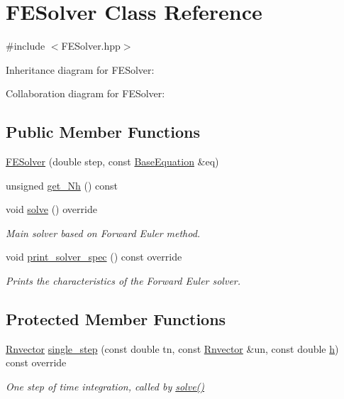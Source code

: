 \hypertarget{classFESolver}{}\section{F\+E\+Solver Class Reference}
\label{classFESolver}


{\ttfamily \#include $<$F\+E\+Solver.\+hpp$>$}



Inheritance diagram for F\+E\+Solver\+:


Collaboration diagram for F\+E\+Solver\+:
\subsection*{Public Member Functions}
\begin{DoxyCompactItemize}
\item 
\hyperlink{classFESolver_adbd4e19eb5c39bdbced70671961bbc4d}{F\+E\+Solver} (double step, const \hyperlink{classBaseEquation}{Base\+Equation} \&eq)
\item 
unsigned \hyperlink{classFESolver_a1b7bde8ef3e3e4650096e1d56ad3add1}{get\+\_\+\+Nh} () const
\item 
void \hyperlink{classFESolver_ac6ac17db7001191c7bb32c3e8ce74d55}{solve} () override
\begin{DoxyCompactList}\small\item\em Main solver based on Forward Euler method. \end{DoxyCompactList}\item 
void \hyperlink{classFESolver_a46f8b70e97141583f68c5dfeb79e80c8}{print\+\_\+solver\+\_\+spec} () const override
\begin{DoxyCompactList}\small\item\em Prints the characteristics of the Forward Euler solver. \end{DoxyCompactList}\end{DoxyCompactItemize}
\subsection*{Protected Member Functions}
\begin{DoxyCompactItemize}
\item 
\hyperlink{utils_8hpp_a8e0cccfe9e5cee5140bfcfbd9a3a6a0e}{Rnvector} \hyperlink{classFESolver_acb3624bbe9132b8ab2989fc97ac33d81}{single\+\_\+step} (const double tn, const \hyperlink{utils_8hpp_a8e0cccfe9e5cee5140bfcfbd9a3a6a0e}{Rnvector} \&un, const double \hyperlink{classBaseSolver_a6dbedd1610b0979379e6acbb0a4093cd}{h}) const override
\begin{DoxyCompactList}\small\item\em One step of time integration, called by \hyperlink{classFESolver_ac6ac17db7001191c7bb32c3e8ce74d55}{solve()} \end{DoxyCompactList}\end{DoxyCompactItemize}
